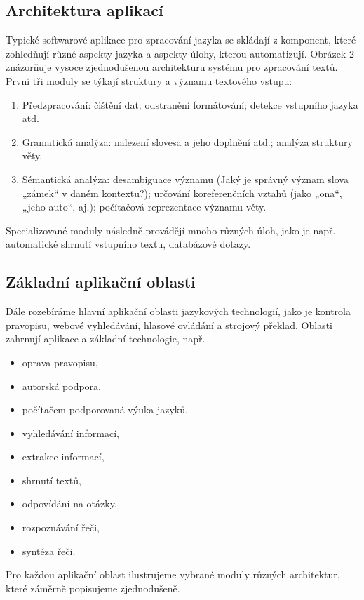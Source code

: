 \begin{multicols}{2}
\subsection{Architektura aplikací}

Typické softwarové aplikace pro zpracování jazyka se skládají z komponent, které zohledňují různé aspekty jazyka a aspekty úlohy, kterou automatizují. Obrázek 2 znázorňuje vysoce zjednodušenou architekturu systému pro zpracování textů. První tři moduly se týkají struktury a významu textového vstupu:
\begin{enumerate}
  \item Předzpracování: čištění dat; odstranění formátování; detekce vstupního jazyka atd.
  \item Gramatická analýza: nalezení slovesa a jeho doplnění atd.; analýza struktury věty.
  \item Sémantická analýza: desambiguace významu (Jaký je správný význam slova „zámek“ v daném kontextu?); určování koreferenčních vztahů (jako „ona“, „jeho auto“, aj.); počítačová reprezentace významu věty.
\end{enumerate}
Specializované moduly následně provádějí mnoho různých úloh, jako je např. automatické shrnutí vstupního textu, databázové dotazy.

\subsection{Základní aplikační oblasti}

Dále rozebíráme hlavní aplikační oblasti jazykových technologií, jako je kontrola pravopisu, webové vyhledávání, hlasové ovládání a strojový překlad. Oblasti zahrnují aplikace a základní technologie, např.\\
\begin{itemize}
  \item oprava pravopisu,
  \item autorská podpora,
  \item počítačem podporovaná výuka jazyků,
  \item vyhledávání informací,
  \item extrakce informací,
  \item shrnutí textů,
  \item odpovídání na otázky,
  \item rozpoznávání řeči,
  \item syntéza řeči.
\end{itemize}
Pro každou aplikační oblast ilustrujeme vybrané moduly různých architektur, které záměrně popisujeme zjednodušeně.


\end{multicols}
